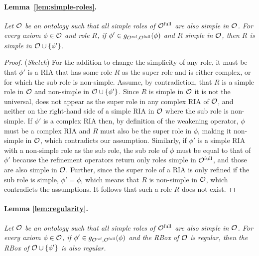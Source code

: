 \documentclass[
]{ceurart}
\begin{document}
\paragraph{Lemma~\ref{lem:simple-roles}.}
{\it Let $\mathcal{O}$ be an ontology such that all simple roles of ${\mathcal{O}^\textnormal{full}}$ are also simple in $\mathcal{O}$. For every axiom $\phi \in \mathcal{O}$ and role $R$, if $\phi' \in g_{{\mathcal{O}^\textnormal{ref}},{\mathcal{O}^\textnormal{full}}}(\phi)$ and $R$ simple in $\mathcal{O}$, then $R$ is simple in $\mathcal{O} \cup \{ \phi' \}$.
}

\begin{proof}(\emph{Sketch})
  For the addition to change the simplicity of any role, it must be that $\phi'$ is a RIA that has some role $R$ as the super role and is either complex, or for which the sub role is non-simple. Assume, by contradiction, that $R$ is a simple role in $\mathcal{O}$ and non-simple in $\mathcal{O} \cup \{ \phi' \}$. Since $R$ is simple in $\mathcal{O}$ it is not the universal, does not appear as the super role in any complex RIA of $\mathcal{O}$, and neither on the right-hand side of a simple RIA in $\mathcal{O}$ where the sub role is non-simple. If $\phi'$ is a complex RIA then, by definition of the weakening operator, $\phi$ must be a complex RIA and $R$ must also be the super role in $\phi$, making it non-simple in $\mathcal{O}$, which contradicts our assumption. Similarly, if $\phi'$ is a simple RIA with a non-simple role as the sub role, the sub role of $\phi$ must be equal to that of $\phi'$ because the refinement operators return only roles simple in ${\mathcal{O}^\textnormal{full}}$, and those are also simple in $\mathcal{O}$. Further, since the super role of a RIA is only refined if the sub role is simple, $\phi' = \phi$, which means that $R$ is non-simple in $\mathcal{O}$, which contradicts the assumptions. It follows that such a role $R$ does not exist.
\end{proof}

\paragraph{Lemma \ref{lem:regularity}.}
{\it Let $\mathcal{O}$ be an ontology such that all simple roles of ${\mathcal{O}^\textnormal{full}}$ are also simple in $\mathcal{O}$. For every axiom $\phi \in \mathcal{O}$, if $\phi' \in g_{{\mathcal{O}^\textnormal{ref}},{\mathcal{O}^\textnormal{full}}}(\phi)$ and the RBox of $\mathcal{O}$ is regular, then the RBox of $\mathcal{O} \cup \{ \phi' \}$ is also regular.
  }
\end{document}
